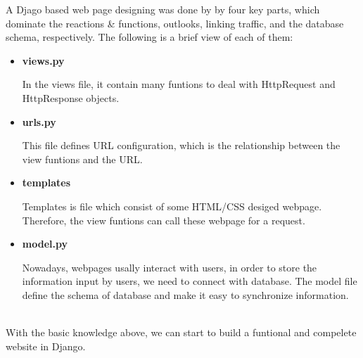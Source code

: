 A Djago based web page designing was done by by four key parts, which dominate the reactions \& functions, outlooks, linking traffic, and the database schema, respectively. The following is a brief view of each of them:
\begin{itemize}
	\item[] \textbf{views.py}
	
	In the views file, it contain many funtions to deal with HttpRequest and  HttpResponse objects.
	\item[] \textbf{urls.py}
	
	This file defines URL configuration, which is the relationship between the view funtions and the URL.
	\item[] \textbf{templates}
	
	Templates is file which consist of some HTML/CSS desiged webpage. Therefore, the view funtions can call these webpage for a request.
	\item[] \textbf{model.py}
	
	Nowadays, webpages usally interact with users, in order to store the information input by users, we need to connect with database. The model file define the schema of database and make it easy to synchronize information.\\\\
\end{itemize}
With the basic knowledge above, we can start to build a funtional and compelete website in Django.
